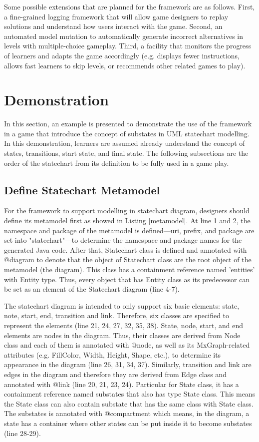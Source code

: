 \documentclass[conference]{IEEEtran}
\begin{document}
Some possible extensions that are planned for the framework are as follows. First, a fine-grained logging framework that will allow game designers to replay solutions and understand how users interact with the game. Second, an automated model mutation to automatically generate incorrect alternatives in levels with multiple-choice gameplay. Third, a facility that monitors the progress of learners and adapts the game accordingly (e.g. displays fewer instructions, allows fast learners to skip levels, or recommends other related games to play).

\section{Demonstration}
\label{Demonstration}
In this section, an example is presented to demonstrate the use of the framework in a game that introduce the concept of substates in UML statechart modelling. In this demonstration, learners are assumed already understand the concept of states, transitions, start state, and final state. The following subsections are the order of the statechart from its definition to be fully used in a game play.
 
\subsection{Define Statechart Metamodel}
For the framework to support modelling in statechart diagram, designers should define its metamodel first as showed in Listing \ref{metamodel}. 
At line 1 and 2, the namespace and package of the metamodel is defined---uri, prefix, and package are set into "statechart"---to determine the namespace and package names for the generated Java code. After that, Statechart class is defined and annotated with {\selectfont @diagram} to denote that the object of Statechart class are the root object of the metamodel (the diagram). This class has a containment reference named 'entities' with Entity type. Thus, every object that has Entity class as its predecessor can be set as an element of the Statechart diagram (line 4-7).  

The statechart diagram is intended to only support six basic elements: state, note, start, end, transition and link. Therefore, six classes are specified to represent the elements (line 21, 24, 27, 32, 35, 38). State, node, start, and end elements are nodes in the diagram. Thus, their classes are derived from Node class and each of them is annotated with {\selectfont @node}, as well as its MxGraph-related attributes (e.g. FillColor, Width, Height, Shape, etc.), to determine its appearance in the diagram (line 26, 31, 34, 37). Similarly, transition and link are edges in the diagram and therefore they are derived from Edge class and annotated with {\selectfont @link} (line 20, 21, 23, 24). Particular for State class, it has a containment reference named substates that also has type State class. This means the State class can also contain substate that has the same class with State class. The substates is annotated with {\selectfont @compartment} which means, in the diagram, a state has a container where other states can be put inside it to become substates (line 28-29).
\end{document}
